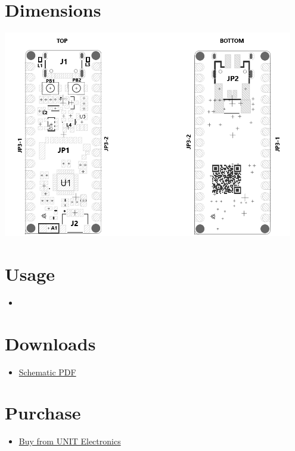 \documentclass[10pt]{article}
\begin{document}
\section*{Dimensions}
\vspace{1em}
\begin{center}
\includegraphics[width=0.95\textwidth,keepaspectratio]{images/dimensions.png}
\end{center}



\section*{Usage}
\begin{itemize}
\item 
\end{itemize}

\section*{Downloads}
\begin{itemize}
\begin{itemize}
\item \href{docs/schematic.pdf}{Schematic PDF}
\end{itemize}
\end{itemize}

\section*{Purchase}
\begin{itemize}
\item \href{https://www.uelectronics.com}{Buy from UNIT Electronics}
\end{itemize}
\end{document}
